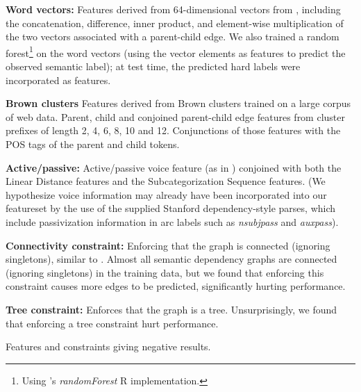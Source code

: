 \documentclass[11pt]{article}
\begin{document}
\begin{savenotes}
\begin{table}
\begin{framed}
\begin{small}

\textbf{Word vectors:} Features derived from 64-dimensional vectors from  \cite{wordVectors}, including the
concatenation, difference, inner product, and element-wise multiplication of the two vectors associated with a parent-child edge. We also trained a random forest\footnote{Using \cite{RandomForest2002}'s \emph{randomForest} R implementation.} on the word vectors (using the vector elements as features to predict the observed semantic label); at test time, the predicted hard labels were incorporated as features.

\textbf{Brown clusters} Features derived from Brown clusters \cite{Brown:1992:CNG:176313.176316}
trained on a large corpus of web data. Parent, child and conjoined parent-child edge features from cluster prefixes of length 2, 4, 6, 8, 10 and 12. Conjunctions of those features with the POS tags of the parent and
child tokens.

\textbf{Active/passive:} Active/passive voice feature
(as in ) conjoined with both the Linear
Distance features and the Subcategorization Sequence features. (We hypothesize
voice information may already have been incorporated into our featureset by the
use of the supplied Stanford dependency-style parses, which include
passivization information in arc labels such as \emph{nsubjpass} and \emph{auxpass}\cite{Marneffe2008DepColing}).


\textbf{Connectivity constraint:} Enforcing that the graph is connected (ignoring singletons), similar
to . Almost all semantic dependency graphs are connected (ignoring singletons) in the
training data, but we found that enforcing this constraint causes more edges to be predicted, significantly hurting
performance.

\textbf{Tree constraint:} Enforces that the graph is a tree. Unsurprisingly, we found that enforcing a tree constraint hurt performance.

\end{small}
\end{framed}
\caption{Features and constraints giving negative results.}
\label{table:negedgefeatures}
\end{table}
\end{savenotes}
\end{document}
